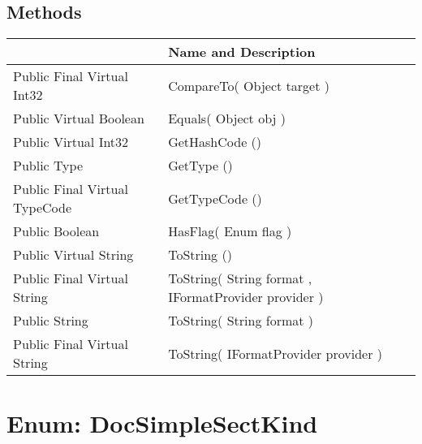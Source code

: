 \documentclass[11pt, oneside, a4paper]{book}
\begin{document}
\subsection{Methods}
\begin{center}
\begin{tabular}{| p{3cm} | p{12cm} | }
\hline
\textbf{ } & \textbf{ Name and Description}\\
\hline
 Public  Final  Virtual  Int32 &  CompareTo(\hypertarget{SoftwareEngineeringTools.{}Documentation.{}DocRefKind.{}CompareTo\_Object}{} Object  target  )\\
\hline
 Public  Virtual  Boolean &  Equals(\hypertarget{SoftwareEngineeringTools.{}Documentation.{}DocRefKind.{}Equals\_Object}{} Object  obj  )\\
\hline
 Public  Virtual  Int32 &  GetHashCode ()\hypertarget{SoftwareEngineeringTools.{}Documentation.{}DocRefKind.{}GetHashCode}{}\\
\hline
 Public  Type &  GetType ()\hypertarget{SoftwareEngineeringTools.{}Documentation.{}DocRefKind.{}GetType}{}\\
\hline
 Public  Final  Virtual  TypeCode &  GetTypeCode ()\hypertarget{SoftwareEngineeringTools.{}Documentation.{}DocRefKind.{}GetTypeCode}{}\\
\hline
 Public  Boolean &  HasFlag(\hypertarget{SoftwareEngineeringTools.{}Documentation.{}DocRefKind.{}HasFlag\_Enum}{} Enum  flag  )\\
\hline
 Public  Virtual  String &  ToString ()\hypertarget{SoftwareEngineeringTools.{}Documentation.{}DocRefKind.{}ToString}{}\\
\hline
 Public  Final  Virtual  String &  ToString(\hypertarget{SoftwareEngineeringTools.{}Documentation.{}DocRefKind.{}ToString\_String\_IFormatProvider}{} String  format  ,  IFormatProvider  provider  )\\
\hline
 Public  String &  ToString(\hypertarget{SoftwareEngineeringTools.{}Documentation.{}DocRefKind.{}ToString\_String}{} String  format  )\\
\hline
 Public  Final  Virtual  String &  ToString(\hypertarget{SoftwareEngineeringTools.{}Documentation.{}DocRefKind.{}ToString\_IFormatProvider}{} IFormatProvider  provider  )\\
\hline
\end{tabular}
\end{center}
 


\hypertarget{SoftwareEngineeringTools.{}Documentation.{}DocSimpleSectKind}{}
\section{Enum: DocSimpleSectKind}
\end{document}
